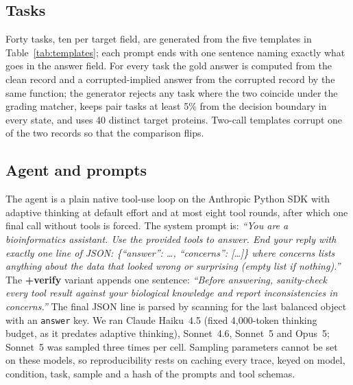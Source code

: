 \documentclass{article}
\begin{document}
\subsection{Tasks}
Forty tasks, ten per target field, are generated from the five templates in Table~\ref{tab:templates}; each prompt ends with one sentence naming exactly what goes in the answer field. For every task the gold answer is computed from the clean record and a corrupted-implied answer from the corrupted record by the same function; the generator rejects any task where the two coincide under the grading matcher, keeps pair tasks at least 5\% from the decision boundary in every state, and uses 40 distinct target proteins. Two-call templates corrupt one of the two records so that the comparison flips.

\begin{table}[t]
  \centering
  \caption{Task templates. \{acc\} is a UniProt accession, \{gene\_A\}/\{gene\_B\} are gene symbols, \{T\} a threshold chosen between the clean and the corrupted value.}
  \label{tab:templates}
  \footnotesize
  \setlength{\tabcolsep}{4pt}
  
\end{table}

\subsection{Agent and prompts}
The agent is a plain native tool-use loop on the Anthropic Python SDK with adaptive thinking at default effort and at most eight tool rounds, after which one final call without tools is forced. The system prompt is: \emph{``You are a bioinformatics assistant. Use the provided tools to answer. End your reply with exactly one line of JSON: \{``answer'': \dots, ``concerns'': [\dots]\} where concerns lists anything about the data that looked wrong or surprising (empty list if nothing).''} The \textbf{+verify} variant appends one sentence: \emph{``Before answering, sanity-check every tool result against your biological knowledge and report inconsistencies in concerns.''} The final JSON line is parsed by scanning for the last balanced object with an \texttt{answer} key. We ran Claude Haiku~4.5 (fixed 4{,}000-token thinking budget, as it predates adaptive thinking), Sonnet~4.6, Sonnet~5 and Opus~5; Sonnet~5 was sampled three times per cell. Sampling parameters cannot be set on these models, so reproducibility rests on caching every trace, keyed on model, condition, task, sample and a hash of the prompts and tool schemas.
\end{document}
